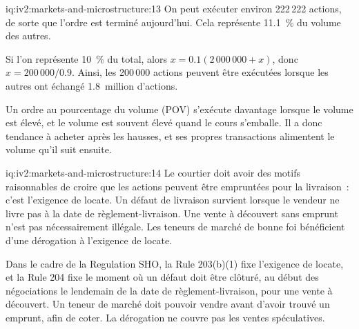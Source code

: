 \begin{solution}{iq:iv2:markets-and-microstructure:13}
On peut exécuter environ 222\,222 actions, de sorte que l'ordre est terminé aujourd'hui. Cela représente 11.1~\% du volume des autres.

Si l'on représente 10~\% du total, alors $x = 0.1(2\,000\,000 + x)$, donc $x = 200\,000/0.9$. Ainsi, les 200\,000 actions peuvent être exécutées lorsque les autres ont échangé 1.8~million d'actions.

Un ordre au pourcentage du volume (POV) s'exécute davantage lorsque le volume est élevé, et le volume est souvent élevé quand le cours s'emballe. Il a donc tendance à acheter après les hausses, et ses propres transactions alimentent le volume qu'il suit ensuite.

\end{solution}

\begin{solution}{iq:iv2:markets-and-microstructure:14}
Le courtier doit avoir des motifs raisonnables de croire que les actions peuvent être empruntées pour la livraison~: c'est l'exigence de locate. Un défaut de livraison survient lorsque le vendeur ne livre pas à la date de règlement-livraison. Une vente à découvert sans emprunt n'est pas nécessairement illégale. Les teneurs de marché de bonne foi bénéficient d'une dérogation à l'exigence de locate.

Dans le cadre de la Regulation SHO, la Rule 203(b)(1) fixe l'exigence de locate, et la Rule 204 fixe le moment où un défaut doit être clôturé, au début des négociations le lendemain de la date de règlement-livraison, pour une vente à découvert. Un teneur de marché doit pouvoir vendre avant d'avoir trouvé un emprunt, afin de coter. La dérogation ne couvre pas les ventes spéculatives.

\end{solution}

